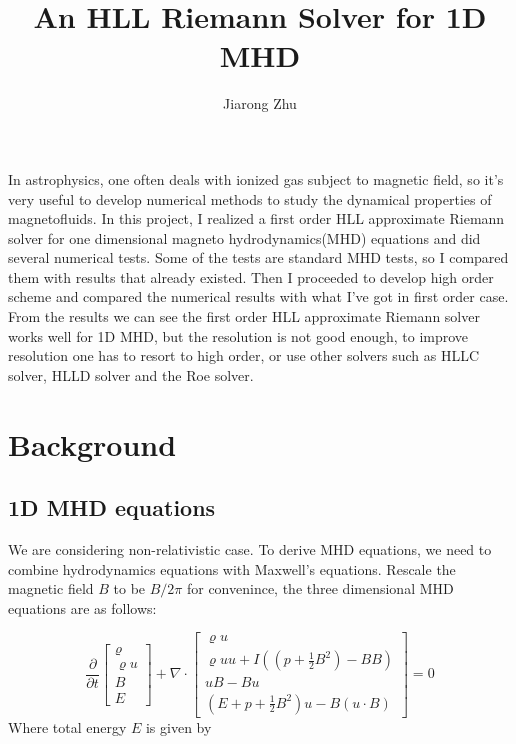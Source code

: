 \documentclass[11pt, oneside]{article}   	%
\title{An HLL Riemann Solver for 1D MHD}
\author{Jiarong Zhu}
\date{}							%
\begin{document}
\maketitle
In astrophysics, one often deals with ionized gas subject to magnetic field, so it's very useful to develop numerical methods to study the dynamical properties of magnetofluids. In this project, I realized a first order HLL approximate Riemann solver for one dimensional magneto hydrodynamics(MHD) equations and did several numerical tests. Some of the tests are standard MHD tests, so I compared them with results that already existed. Then I proceeded to develop high order scheme and compared the numerical results with what I've got in first order case. From the results we can see the first order HLL approximate Riemann solver works well for 1D MHD, but the resolution is not good enough, to improve resolution one has to resort to high order, or use other solvers such as HLLC solver, HLLD solver and the Roe solver. 

\section{Background}
 
\subsection{1D MHD equations}
We are considering non-relativistic case. To derive MHD equations, we need to combine hydrodynamics equations with Maxwell's equations. Rescale the magnetic field $B$ to be $B/2\pi$ for convenince, the three dimensional MHD equations are as follows:

\begin{equation}
\frac { \partial } { \partial t } \left[ \begin{array} { c } { \varrho } \\ { \varrho u } \\ { B } \\ { E } \end{array} \right] + \nabla \cdot \left[ \begin{array} { c } { \varrho u } \\ { \varrho u u + I \left( \left( p + \frac { 1 } { 2 } B ^ { 2 } \right) - B B \right) } \\ { u B - B u } \\ { \left( E + p + \frac { 1 } { 2 } B ^ { 2 } \right) u - B ( u \cdot B ) } \end{array} \right] = 0
\end{equation}
Where  total energy $E$ is given by
\end{document}
